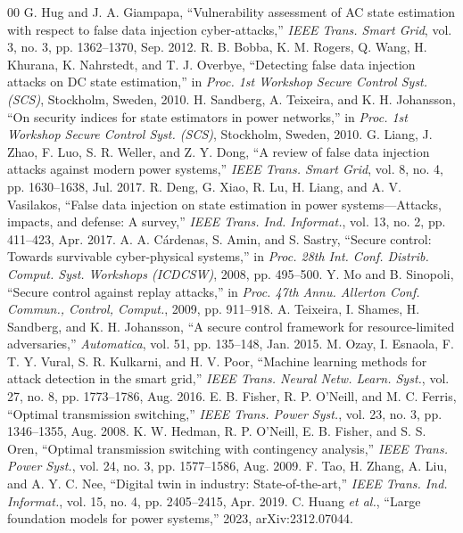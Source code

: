 \documentclass{ieeeaccess}
\begin{document}
\begin{thebibliography}{00}
 G. Hug and J. A. Giampapa, ``Vulnerability assessment of AC state estimation with respect to false data injection cyber-attacks,'' \emph{IEEE Trans. Smart Grid}, vol. 3, no. 3, pp. 1362--1370, Sep. 2012.
 R. B. Bobba, K. M. Rogers, Q. Wang, H. Khurana, K. Nahrstedt, and T. J. Overbye, ``Detecting false data injection attacks on DC state estimation,'' in \emph{Proc. 1st Workshop Secure Control Syst. (SCS)}, Stockholm, Sweden, 2010.
 H. Sandberg, A. Teixeira, and K. H. Johansson, ``On security indices for state estimators in power networks,'' in \emph{Proc. 1st Workshop Secure Control Syst. (SCS)}, Stockholm, Sweden, 2010.
 G. Liang, J. Zhao, F. Luo, S. R. Weller, and Z. Y. Dong, ``A review of false data injection attacks against modern power systems,'' \emph{IEEE Trans. Smart Grid}, vol. 8, no. 4, pp. 1630--1638, Jul. 2017.
 R. Deng, G. Xiao, R. Lu, H. Liang, and A. V. Vasilakos, ``False data injection on state estimation in power systems---Attacks, impacts, and defense: A survey,'' \emph{IEEE Trans. Ind. Informat.}, vol. 13, no. 2, pp. 411--423, Apr. 2017.
 A. A. C\'ardenas, S. Amin, and S. Sastry, ``Secure control: Towards survivable cyber-physical systems,'' in \emph{Proc. 28th Int. Conf. Distrib. Comput. Syst. Workshops (ICDCSW)}, 2008, pp. 495--500.
 Y. Mo and B. Sinopoli, ``Secure control against replay attacks,'' in \emph{Proc. 47th Annu. Allerton Conf. Commun., Control, Comput.}, 2009, pp. 911--918.
 A. Teixeira, I. Shames, H. Sandberg, and K. H. Johansson, ``A secure control framework for resource-limited adversaries,'' \emph{Automatica}, vol. 51, pp. 135--148, Jan. 2015.
 M. Ozay, I. Esnaola, F. T. Y. Vural, S. R. Kulkarni, and H. V. Poor, ``Machine learning methods for attack detection in the smart grid,'' \emph{IEEE Trans. Neural Netw. Learn. Syst.}, vol. 27, no. 8, pp. 1773--1786, Aug. 2016.
 E. B. Fisher, R. P. O'Neill, and M. C. Ferris, ``Optimal transmission switching,'' \emph{IEEE Trans. Power Syst.}, vol. 23, no. 3, pp. 1346--1355, Aug. 2008.
 K. W. Hedman, R. P. O'Neill, E. B. Fisher, and S. S. Oren, ``Optimal transmission switching with contingency analysis,'' \emph{IEEE Trans. Power Syst.}, vol. 24, no. 3, pp. 1577--1586, Aug. 2009.
 F. Tao, H. Zhang, A. Liu, and A. Y. C. Nee, ``Digital twin in industry: State-of-the-art,'' \emph{IEEE Trans. Ind. Informat.}, vol. 15, no. 4, pp. 2405--2415, Apr. 2019.
 C. Huang \emph{et al.}, ``Large foundation models for power systems,'' 2023, arXiv:2312.07044.

\end{thebibliography}
\end{document}
